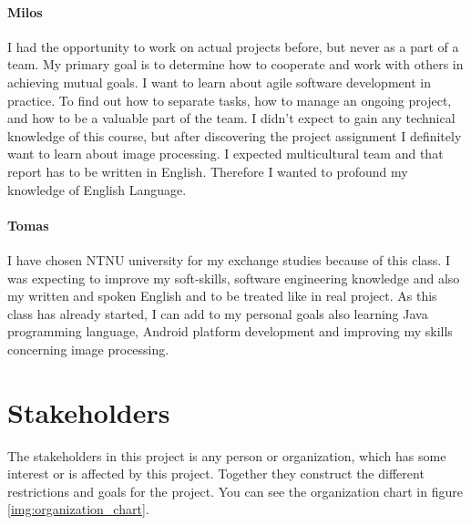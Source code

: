 \paragraph{Milos}

I had the opportunity to work on actual projects before, but never as a part of a team. 
My primary goal is to determine how to cooperate and work with others in achieving mutual goals.
I want to learn about agile software development in practice.
To find out how to separate tasks, how to manage an ongoing project, and how to be a valuable part of the team.
I didn't expect to gain any technical knowledge of this course, but after discovering the project assignment I definitely want to learn about image processing.
I expected multicultural team and that report has to be written in English.
Therefore I wanted to profound my knowledge of English Language.

\paragraph{Tomas}
I have chosen NTNU university for my exchange studies because of this class. 
I was expecting to improve my soft-skills, software engineering knowledge and also my written and spoken English and to be treated like in real project.
As this class has already started, I can add to my personal goals also learning Java programming language,
Android platform development and improving my skills concerning image processing.

\section{Stakeholders}

The stakeholders in this project is any person or organization, which has some interest or is affected by this project. Together they construct the different restrictions and goals for the project. 
You can see the organization chart in figure \ref{img:organization_chart}.

